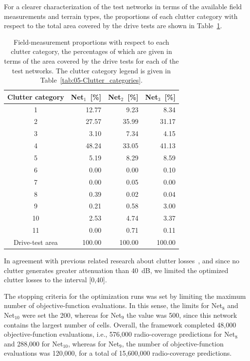 For a clearer characterization of the test networks in terms of the
available field measurements and terrain types, the proportions of
each clutter category with respect to the total area covered by the
drive tests are shown in Table~\ref{tab:05-Proportion_of_clutter_for_test_networks}.

\begin{table}
\centering

\caption{Field-measurement proportions with respect to each clutter category,
the percentages of which are given in terms of the area covered by
the drive tests for each of the test networks. The clutter category
legend is given in Table~\ref{tab:05-Clutter_categories}. \label{tab:05-Proportion_of_clutter_for_test_networks}}


{\small{}}%
\begin{tabular}{crrr}
\hline 
{\small{Clutter category}} & {\small{Net$_{1}$~{[}\%{]}}} & {\small{Net$_{2}$~{[}\%{]}}} & {\small{Net$_{3}$~{[}\%{]}}}\tabularnewline
\hline 
{\small{1}} & {\small{12.77}} & {\small{9.23}} & {\small{8.34}}\tabularnewline
{\small{2}} & {\small{27.57}} & {\small{35.99}} & {\small{31.17}}\tabularnewline
{\small{3}} & {\small{3.10}} & {\small{7.34}} & {\small{4.15}}\tabularnewline
{\small{4}} & {\small{48.24}} & {\small{33.05}} & {\small{41.13}}\tabularnewline
{\small{5}} & {\small{5.19}} & {\small{8.29}} & {\small{8.59}}\tabularnewline
{\small{6}} & {\small{0.00}} & {\small{0.00}} & {\small{0.10}}\tabularnewline
{\small{7}} & {\small{0.00}} & {\small{0.05}} & {\small{0.00}}\tabularnewline
{\small{8}} & {\small{0.39}} & {\small{0.02}} & {\small{0.04}}\tabularnewline
{\small{9}} & {\small{0.21}} & {\small{0.58}} & {\small{3.00}}\tabularnewline
{\small{10}} & {\small{2.53}} & {\small{4.74}} & {\small{3.37}}\tabularnewline
{\small{11 }} & {\small{0.00}} & {\small{0.71}} & {\small{0.11}}\tabularnewline
\hline 
{\small{Drive-test area}} & {\small{100.00}} & {\small{100.00}} & {\small{100.00}}\tabularnewline
\hline 
\end{tabular}
\end{table}


In agreement with previous related research about clutter losses~\cite{Rubinstein-Clutter_losses:1998,Shamsan-Fixed_wireless_service:2011},
and since no clutter generates greater attenuation than 40~dB, we
limited the optimized clutter losses to the interval {[}0,40{]}.

The stopping criteria for the optimization runs was set by limiting
the maximum number of objective-function evaluations. In this sense,
the limits for Net$_{8}$ and Net$_{10}$ were set the 200, whereas
for Net$_{9}$ the value was 500, since this network contains the
largest number of cells. Overall, the framework completed 48,000 objective-function
evaluations, i.e., 576,000 radio-coverage predictions for Net$_{8}$
and 288,000 for Net$_{10}$, whereas for Net$_{9}$, the number of
objective-function evaluations was 120,000, for a total of 15,600,000
radio-coverage predictions.


